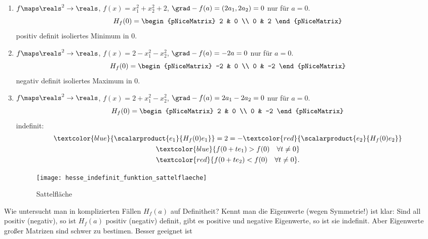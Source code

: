 \begin{beispiele*}
  \begin{enumerate}
    \item \( f\maps \reals^2\to \reals \), \( f(x)=x_1^2+x_2^2+2 \), \(\grad-{f}(a)=(2a_1,2a_2)=0\) nur für \( a=0 \).
    \begin{equation*}
      H_f(0)=\begin{pNiceMatrix} 2 & 0 \\ 0 & 2 \end{pNiceMatrix}
    \end{equation*} positiv definit \timplies isoliertes Minimum in \( 0 \).  
    \item \( f\maps \reals^2\to \reals \), \( f(x)=2-x_1^2-x_2^2 \), \( \grad-{f}(a)=-2a=0 \) nur für \( a=0 \). 
    \begin{equation*}
      H_f(0)=\begin{pNiceMatrix} -2 & 0 \\ 0 & -2 \end{pNiceMatrix}
    \end{equation*}
    negativ definit \timplies isoliertes Maximum in \( 0 \).
    \item \( f\maps \reals^2\to \reals \), \( f(x)=2+x_1^2-x_2^2 \), \( \grad-{f}(a)=2a_1-2a_2=0 \) nur für \( a=0 \).
    \begin{equation*}
      H_f(0)=\begin{pNiceMatrix} 2 & 0 \\ 0 & -2 \end{pNiceMatrix}
    \end{equation*}
    indefinit:
    \begin{gather*}
      \textcolor{blue}{\scalarproduct{e_1}{H_f(0)e_1}}=2=-\textcolor{red}{\scalarproduct{e_2}{H_f(0)e_2}}\\
      \textcolor{blue}{f(0+te_1)>f(0)\quad \forall t\neq 0}\\
      \textcolor{red}{f(0+te_2)<f(0)\quad \forall t\neq 0}.
    \end{gather*}
    \begin{figure}[H]
      \centering
      \texttt{[image: hesse\_indefinit\_funktion\_sattelflaeche]}
      \caption*{Sattelfläche}
      \label{fig:hesse_indefinit_funktion_sattelflaeche}
    \end{figure}
  \end{enumerate}
\end{beispiele*}
\begin{bemerkung*}
  Wie untersucht man in komplizierten Fällen \( H_f(a) \) auf Definitheit? Kennt man die Eigenwerte (\texists wegen Symmetrie!) ist klar: Sind all positiv (negativ), so ist \( H_f(a) \) positiv (negativ) definit, gibt es positive und negative Eigenwerte, so ist sie indefinit. Aber Eigenwerte großer Matrizen sind schwer zu bestimen. Besser geeignet ist
\end{bemerkung*}
